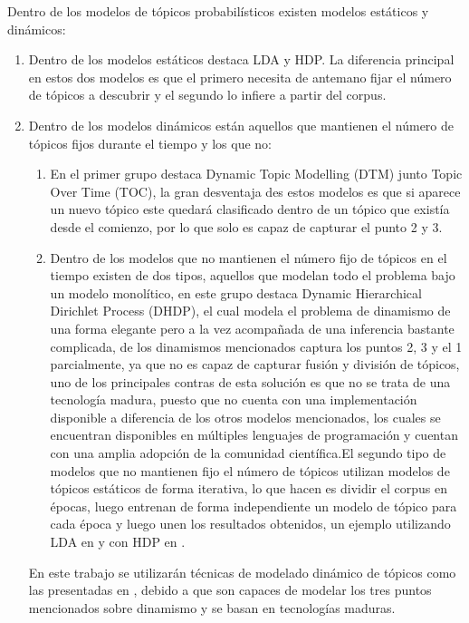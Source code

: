 \documentclass[letterpaper,12pt,oneside]{book} %
\begin{document}
Dentro de los modelos de tópicos probabilísticos existen modelos estáticos y dinámicos:
\begin{enumerate}
    \item Dentro de los modelos estáticos destaca LDA y HDP. La diferencia principal en estos dos modelos es que el primero necesita de antemano fijar el número de tópicos a descubrir y el segundo lo infiere a partir del corpus.
    \item Dentro de los modelos dinámicos están aquellos que mantienen el número de tópicos fijos durante el tiempo y los que no:
    \begin{enumerate}
        \item En el primer grupo destaca Dynamic Topic Modelling (DTM)\citep{blei2006dynamic} junto Topic Over Time (TOC)\citep{wang2006topics}, la gran desventaja des estos modelos es que si aparece un nuevo tópico este quedará clasificado dentro de un tópico que existía desde el comienzo, por lo que solo es capaz de capturar el punto 2 y 3.
        \item Dentro de los modelos que no mantienen el número fijo de tópicos en el tiempo existen de dos tipos, aquellos que modelan todo el problema bajo un modelo monolítico, en este grupo destaca Dynamic Hierarchical Dirichlet Process (DHDP)\citep{ahmed2012timeline}, el cual modela el problema de dinamismo de una forma elegante pero a la vez acompañada de una inferencia bastante complicada, de los dinamismos mencionados captura los puntos 2, 3 y el 1 parcialmente, ya que no es capaz de capturar fusión y división de tópicos, uno de los principales contras de esta solución es que no se trata de una tecnología madura, puesto que no cuenta con una implementación disponible a diferencia de los otros modelos mencionados, los cuales se encuentran disponibles en múltiples lenguajes de programación y cuentan con una amplia adopción de la comunidad científica.El segundo tipo de modelos que no mantienen fijo el número de tópicos utilizan modelos de tópicos estáticos de forma iterativa, lo que hacen es dividir el corpus en épocas, luego entrenan de forma independiente un modelo de tópico para cada época y luego unen los resultados obtenidos, un ejemplo utilizando LDA en \citep{wilson2011tracking}  y con HDP en \citep{beykikhoshk2018discovering}.
    \end{enumerate}

En este trabajo se utilizarán técnicas de modelado dinámico de tópicos como las presentadas en \citep{wilson2011tracking,beykikhoshk2018discovering}, debido a que son capaces de modelar los tres puntos mencionados sobre dinamismo y se basan en tecnologías maduras.
\end{enumerate}
\end{document}
